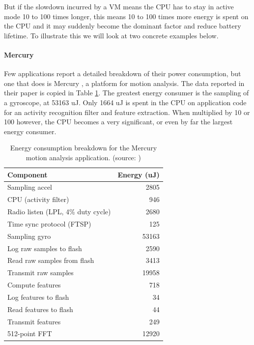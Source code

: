 But if the slowdown incurred by a VM means the CPU has to stay in active mode 10 to 100 times longer, this means 10 to 100 times more energy is spent on the CPU and it may suddenly become the dominant factor and reduce battery lifetime. To illustrate this we will look at two concrete examples below.

\paragraph{Mercury}
Few applications report a detailed breakdown of their power consumption, but one that does is Mercury \cite{Lorincz:2009kt}, a platform for motion analysis. The data reported in their paper is copied in Table \ref{tbl-mercury-energy}. The greatest energy consumer is the sampling of a gyroscope, at 53163 uJ. Only 1664 uJ is spent in the CPU on application code for an activity recognition filter and feature extraction. When multiplied by 10 or 100 however, the CPU becomes a very significant, or even by far the largest energy consumer.

\begin{table}[]
\centering
\caption{Energy consumption breakdown for the Mercury motion analysis application. (source: \cite{Lorincz:2009kt})}
\label{tbl-mercury-energy}
\begin{tabular}{lr}
\toprule
Component                          & Energy (uJ) \\
\midrule
\small
Sampling accel                     &  2805 \\
CPU (activity filter)              &   946 \\
Radio listen (LPL, 4\% duty cycle) &  2680 \\
Time sync protocol (FTSP)          &   125 \\
Sampling gyro                      & 53163 \\
Log raw samples to flash           &  2590 \\
Read raw samples from flash        &  3413 \\
Transmit raw samples               & 19958 \\
\midrule
Compute features                   &   718 \\
Log features to flash              &    34 \\
Read features to flash             &    44 \\
Transmit features                  &   249 \\
\midrule
512-point FFT                      & 12920 \\
\bottomrule
\end{tabular}
\end{table}


